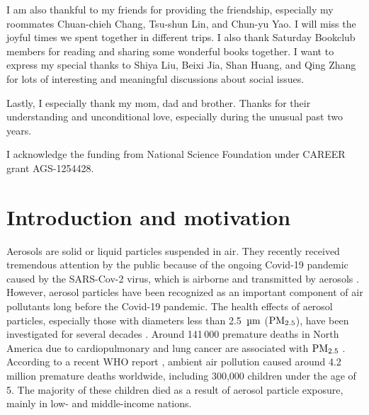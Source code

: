 \documentclass[edeposit,fullpage]{uiucthesis2009}
\begin{document}
I am also thankful to my friends for providing the friendship, especially my roommates Chuan-chieh Chang, Tsu-shun Lin, and Chun-yu Yao. I will miss the joyful times we spent together in different trips. I also thank Saturday Bookclub members for reading and sharing some wonderful books together. I want to express my special thanks to Shiya Liu, Beixi Jia, Shan Huang, and Qing Zhang for lots of interesting and meaningful discussions about social issues. 

Lastly, I especially thank my mom, dad and brother. Thanks for their understanding and unconditional love, especially during the unusual past two years.

I acknowledge the funding from National Science Foundation under CAREER grant AGS-1254428. 

%


\tableofcontents

\mainmatter


\chapter{Introduction and motivation}
\label{chap1}
Aerosols are solid or liquid particles suspended in air. They recently
received tremendous attention by the public because of the ongoing
Covid-19 pandemic caused by the SARS-Cov-2 virus, which is airborne
and transmitted by aerosols
\citep{prather2020reducing,zhang2020identifying,
  miller2021transmission, greenhalgh2021ten}. However, aerosol
particles have been recognized as an important component of air
pollutants long before the Covid-19 pandemic. The health effects of
aerosol particles, especially those with diameters less than 2.5~$\rm
\mu m$ ($\rm PM_{2.5}$), have been investigated for several decades
\citep{dockery1993association, bell2007spatial, fann2012estimating}.
Around 141\,000 premature deaths in North America due to
cardiopulmonary and lung cancer are associated with $\rm PM_{2.5}$
\citep{anenberg2010estimate}. According to a recent WHO report
\citep{world2018air}, ambient air pollution caused around 4.2 million
premature deaths worldwide, including 300,000 children under the age
of 5. The majority of these children died as a result of aerosol
particle exposure, mainly in low- and middle-income nations.
\end{document}
